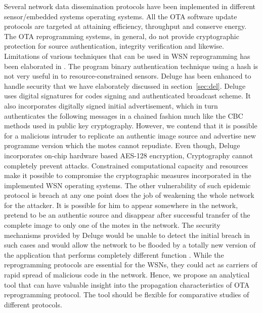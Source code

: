 \documentclass[conference,final]{IEEEtran}
\begin{document}
Several network data dissemination protocols have been implemented in different sensor/embedded systems operating systems.
All the OTA software update protocols are targeted at attaining efficiency, throughput and conserve energy.
The  OTA reprogramming systems, in general, do not provide cryptographic protection for source authentication, integrity verification and likewise. 
Limitations of various techniques that can be used in WSN reprogramming has been elaborated in \cite{1127826}. 
The program binary authentication technique using a hash is not very useful in to resource-constrained sensors. 
Deluge has been enhanced to handle security that we have elaborately discussed in section~\ref{sec:del}. 
Deluge uses digital signatures for codes signing and authenticated broadcast scheme. 
It also incorporates digitally signed initial advertisement, which in turn authenticates the following messages in a chained fashion much like the CBC methods used in public key cryptography.
However, we contend that it is possible for a malicious intruder to replicate an authentic image source and advertise new programme version which the motes cannot repudiate. 
Even though,  Deluge incorporates on-chip hardware based AES-128 encryption,
Cryptography cannot completely prevent attacks.%
Constrained computational capacity and resources make it possible to compromise the cryptographic measures incorporated in the implemented WSN operating systems.
The other vulnerability of such epidemic protocol is breach at any one point does the job of weakening the whole network for the attacker. 
It is possible for him to appear somewhere in the network, pretend to be an authentic source and disappear after successful transfer of the complete image to only one of the motes in the network. 
The security mechanisms provided by Deluge would be unable to detect the initial breach in such cases and would allow the network to be flooded by a totally new version of the application that performs completely different function \cite{Karlof:2004:TLL:1031495.1031515}.
While the reprogramming protocols are essential for the WSNs, they could act as carriers of rapid spread of malicious code in the network.
Hence, we propose an analytical tool that can have valuable insight into the propagation characteristics of OTA reprogramming protocol. 
The tool should be flexible for comparative studies of different protocols. 
\end{document}
